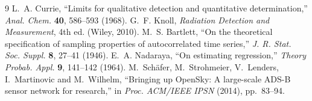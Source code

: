 \documentclass[10pt,twocolumn]{article}
\begin{document}
\begin{thebibliography}{9}
\scriptsize
\setlength{\itemsep}{0pt}
\setlength{\parskip}{0pt}
 L.~A. Currie, ``Limits for qualitative detection and
quantitative determination,'' \emph{Anal. Chem.} \textbf{40}, 586--593 (1968).
 G.~F. Knoll, \emph{Radiation Detection and Measurement},
4th ed. (Wiley, 2010).
 M.~S. Bartlett, ``On the theoretical specification of
sampling properties of autocorrelated time series,'' \emph{J. R. Stat. Soc.
Suppl.} \textbf{8}, 27--41 (1946).
 E.~A. Nadaraya, ``On estimating regression,''
\emph{Theory Probab. Appl.} \textbf{9}, 141--142 (1964).
 M.~Sch\"afer, M.~Strohmeier, V.~Lenders, I.~Martinovic
and M.~Wilhelm, ``Bringing up OpenSky: A large-scale ADS-B sensor network for
research,'' in \emph{Proc. ACM/IEEE IPSN} (2014), pp.~83--94.
\end{thebibliography}
\end{document}
